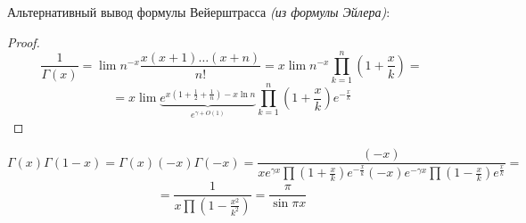 

\cfoot{}



Альтернативный вывод формулы Вейерштрасса \textit{(из формулы Эйлера)}:
\begin{proof}
    $$\frac{1}{\Gamma(x)}=\lim n^{-x}\frac{x(x+1)\ldots (x+n)}{n!}=x\lim n^{-x}\prod_{k=1}^n \left(1+\frac{x}{k}\right)=$$
    $$=x\lim \underbrace{e^{x\left(1+\frac{1}{2}+\frac{1}{n}\right)-x\ln n}}_{e^{\gamma+O(1)}}\prod\limits_{k=1}^{n}\left(1+\frac{x}{k}\right)e^{-\frac{x}{k}}$$
\end{proof}

\begin{remark}
    $$\Gamma(x)\Gamma(1-x)=\Gamma(x)(-x)\Gamma(-x)=\frac{(-x)}{xe^{\gamma x}\prod \left(1+\frac{x}{k}\right)e^{-\frac{x}{k}}(-x)e^{-\gamma x}\prod \left(1-\frac{x}{k}\right)e^{\frac{x}{k}}}=$$
    $$=\frac{1}{x \prod \left(1-\frac{x^2}{k^2}\right)}=\frac{\pi}{\sin \pi x}$$
\end{remark}

